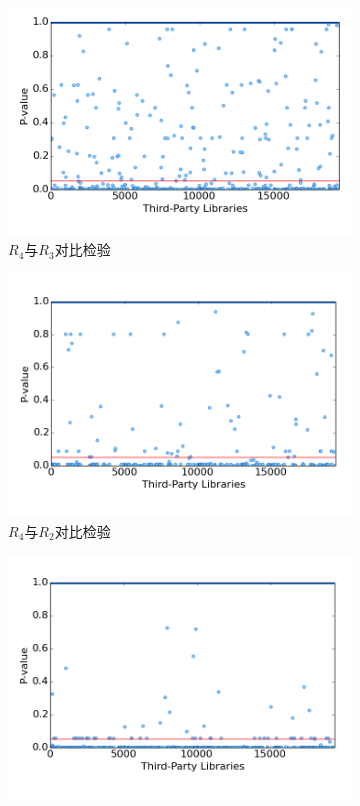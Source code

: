 \begin{figure}
	\centering
	\begin{subfigure}[b]{0.49\textwidth}
		\includegraphics[width=\textwidth]{figures/r4_r3}
		\caption{$R_4$与$R_3$对比检验}
	\end{subfigure}
	\begin{subfigure}[b]{0.49\textwidth}
		\includegraphics[width=\textwidth]{figures/r4_r2}
		\caption{$R_4$与$R_2$对比检验}
	\end{subfigure}
	\begin{subfigure}[b]{0.49\textwidth}
		\includegraphics[width=\textwidth]{figures/r4_r0}

\end{subfigure}
\end{figure}
